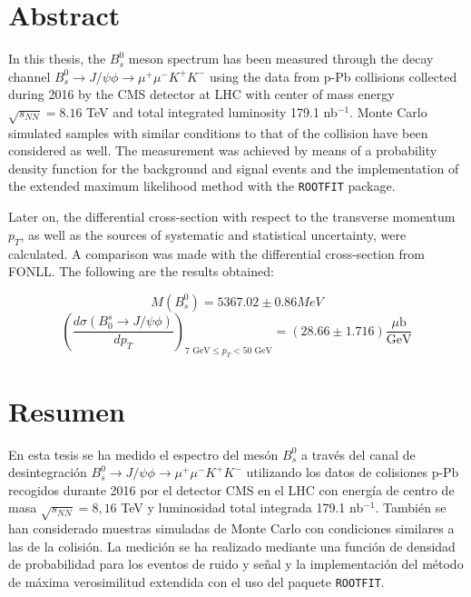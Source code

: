 \chapter*{Abstract}
\label{chap:Abstract}
In this thesis, the $B^0_s$ meson spectrum has been measured through the decay channel $B^0_s \to J/\psi \phi \to \mu^{+}\mu^{-} K^{+}K^{-}$ using the data from p-Pb collisions collected during 2016 by the CMS detector at LHC with center of mass energy $\sqrt{s_{NN}} = 8.16$ TeV and total integrated luminosity 179.1 nb$^{-1}$. Monte Carlo simulated samples with similar conditions to that of the collision have been considered as well. The measurement was achieved by means of a probability density function for the background and signal events and the implementation of the extended maximum likelihood method with the \verb|ROOTFIT| package. 

Later on, the differential cross-section with respect to the transverse momentum $p_T$, as well as the sources of systematic and statistical uncertainty, were calculated. A comparison was made with the differential cross-section from FONLL. The following are the results obtained:

$$M(B^0_s) = 5367.02 \pm 0.86 MeV$$
$$\left(\frac{d \sigma(B_0^s \to J/\psi\phi)}{dp_T} \right)_{ 7 \text{ GeV} \leq p_T < 50 \text{ GeV}} = (28.66 \pm 1.716) \frac{\mu\text{b}}{\text{GeV}}$$

\cleardoublepage

\chapter*{Resumen}
\label{chap:Resumen}
En esta tesis se ha medido el espectro del mesón $B^0_s$ a través del canal de desintegración $B^0_s \to J/\psi \phi \to \mu^{+}\mu^{-} K^{+}K^{-}$ utilizando los datos de colisiones p-Pb recogidos durante 2016 por el detector CMS en el LHC con energía de centro de masa $\sqrt{s_{NN}} = 8,16$ TeV y luminosidad total integrada 179.1 nb$^{-1}$. También se han considerado muestras simuladas de Monte Carlo con condiciones similares a las de la colisión. La medición se ha realizado mediante una función de densidad de probabilidad para los eventos de ruido y señal y la implementación del método de máxima verosimilitud extendida con el uso del paquete \verb|ROOTFIT|. 

